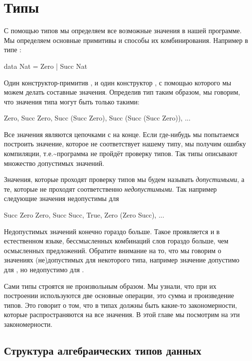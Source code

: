 \chapter{Типы}

С помощью типов мы определяем все возможные значения в нашей программе.
Мы определяем основные примитивы и способы их комбинирования. Например в
типе :


\begin{code}
data Nat = Zero | Succ Nat
\end{code}

Один конструктор-примитив , и один конструктор , с
помощью которого мы можем делать составные значения. Определив тип
 таким образом, мы говорим, что значения типа  могут
быть только такими:


\begin{code}
    Zero,  Succ Zero,  Succ (Succ Zero), Succ (Succ (Succ Zero)), ...
\end{code}

Все значения являются цепочками  с  на конце. Если
где-нибудь мы попытаемся построить значение, которое не соответствует
нашему типу, мы получим ошибку компиляции,
т.е.\textasciitilde{}программа не пройдёт проверку типов. Так типы
описывают множество допустимых значений.

Значения, которые проходят проверку типов мы будем называть
\emph{допустимыми}, а те, которые не проходят соответственно
\emph{недопустимыми}. Так например следующие значения недопустимы для


\begin{code}
    Succ Zero Zero,  Succ Succ, True, Zero (Zero Succ), ...
\end{code}

Недопустимых значений конечно гораздо больше. Такое проявляется и в
естественном языке, бессмысленных комбинаций слов гораздо больше, чем
осмысленных предложений. Обратите внимание на то, что мы говорим о
значениях (не)допустимых для некоторого типа, например значение
 допустимо для , но недопустимо для .

Сами типы строятся не произвольным образом. Мы узнали, что при их
построении используются две основные операции, это сумма и произведение
типов. Это говорит о том, что в типах должны быть какие-то
закономерности, которые распространяются на все значения. В этой главе
мы посмотрим на эти закономерности.

\section{Структура алгебраических типов данных}

